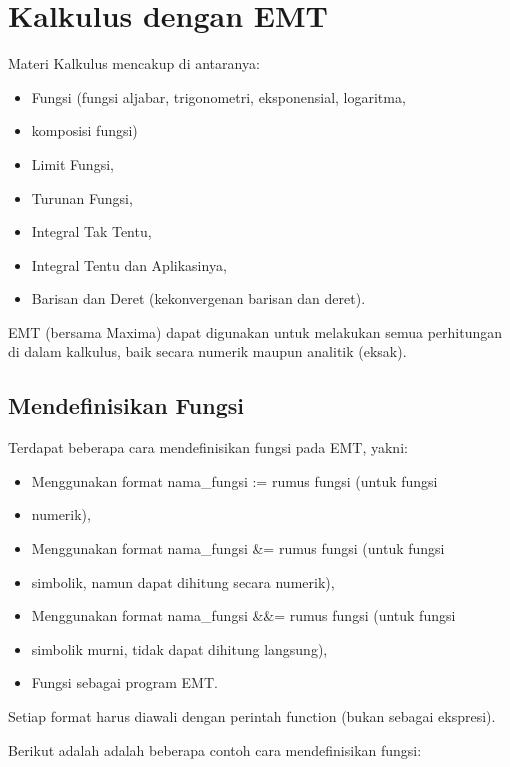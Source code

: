\documentclass[
]{book}
\author{}
\date{}
\begin{document}
\frontmatter

\mainmatter
\chapter{Kalkulus dengan EMT}\label{kalkulus-dengan-emt}

Materi Kalkulus mencakup di antaranya:

\begin{itemize}
\item
  Fungsi (fungsi aljabar, trigonometri, eksponensial, logaritma,
\item
  komposisi fungsi)
\item
  Limit Fungsi,
\item
  Turunan Fungsi,
\item
  Integral Tak Tentu,
\item
  Integral Tentu dan Aplikasinya,
\item
  Barisan dan Deret (kekonvergenan barisan dan deret).
\end{itemize}

EMT (bersama Maxima) dapat digunakan untuk melakukan semua perhitungan di dalam kalkulus, baik secara numerik maupun analitik (eksak).

\section{Mendefinisikan Fungsi}\label{mendefinisikan-fungsi}

Terdapat beberapa cara mendefinisikan fungsi pada EMT, yakni:

\begin{itemize}
\item
  Menggunakan format nama\_fungsi := rumus fungsi (untuk fungsi
\item
  numerik),
\item
  Menggunakan format nama\_fungsi \&= rumus fungsi (untuk fungsi
\item
  simbolik, namun dapat dihitung secara numerik),
\item
  Menggunakan format nama\_fungsi \&\&= rumus fungsi (untuk fungsi
\item
  simbolik murni, tidak dapat dihitung langsung),
\item
  Fungsi sebagai program EMT.
\end{itemize}

Setiap format harus diawali dengan perintah function (bukan sebagai ekspresi).

Berikut adalah adalah beberapa contoh cara mendefinisikan fungsi:
\end{document}
